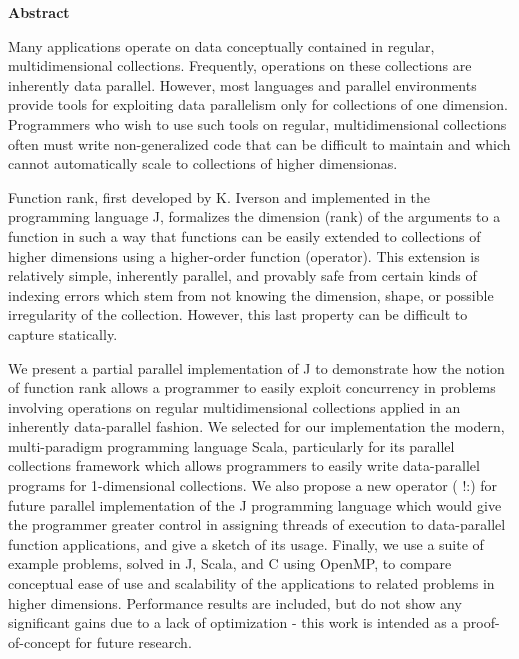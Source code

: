 \begin{center}

\bigskip

\begin{Large}
\textbf{\theTitle}
\end{Large}

\bigskip

\begin{large}
\theAuthor
\end{large}

\bigskip
\bigskip

\textbf{Abstract}

\end{center}

\noindent
Many applications operate on data conceptually contained in regular, multidimensional collections.
Frequently, operations on these collections are inherently data parallel.
However, most languages and parallel environments provide tools for exploiting data parallelism only for collections of one dimension.
Programmers who wish to use such tools on regular, multidimensional collections often must write non-generalized code that can be difficult to maintain and which cannot automatically scale to collections of higher dimensionas.

Function rank, first developed by K. Iverson and implemented in the programming language J, formalizes the dimension (rank) of the arguments to a function in such a way that functions can be easily extended to collections of higher dimensions using a higher-order function (operator).
This extension is relatively simple, inherently parallel, and provably safe from certain kinds of indexing errors which stem from not knowing the dimension, shape, or possible irregularity of the collection.
However, this last property can be difficult to capture statically.

We present a partial parallel implementation of J to demonstrate how the notion of function rank allows a programmer to easily exploit concurrency in problems involving operations on regular multidimensional collections applied in an inherently data-parallel fashion.
We selected for our implementation the modern, multi-paradigm programming language Scala, particularly for its parallel collections framework which allows programmers to easily write data-parallel programs for 1-dimensional collections.
We also propose a new operator ( !:\normalfont) for future parallel implementation of the J programming language which would give the programmer greater control in assigning threads of execution to data-parallel function applications, and give a sketch of its usage.
Finally, we use a suite of example problems, solved in J, Scala, and C using OpenMP, to compare conceptual ease of use and scalability of the applications to related problems in higher dimensions.
Performance results are included, but do not show any significant gains due to a lack of optimization - this work is intended as a proof-of-concept for future research.
